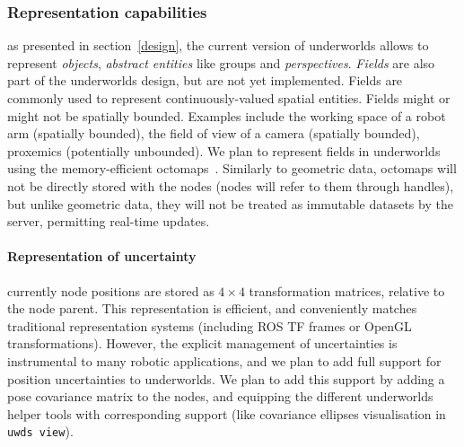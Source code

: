 \documentclass[letterpaper, 10pt, conference]{ieeeconf}
\newcommand{\uwds}{{\sc underworlds}\xspace}
\begin{document}
{\subsubsection{Representation capabilities} as presented in
section~\ref{design}, the current version of \uwds allows to represent
\emph{objects}, \emph{abstract entities} like groups and \emph{perspectives}.
\emph{Fields} are also part of the \uwds design, but are not yet implemented.
Fields are commonly used to represent
continuously-valued spatial entities. Fields might or might not be spatially
bounded. Examples include the working space of a robot arm (spatially bounded),
the field of view of a camera (spatially bounded), proxemics (potentially
unbounded). We plan to represent fields in \uwds using the memory-efficient
octomaps~\cite{hornung2013octomap}. Similarly to geometric data, octomaps
will not be directly stored with the nodes (nodes will refer to them through 
handles), but unlike geometric data, they will not be treated as immutable
datasets by the server, permitting real-time updates.

\paragraph*{Representation of uncertainty} currently node positions are 
stored as $4\times4$ transformation matrices, relative to the node parent. This
representation is efficient, and conveniently matches traditional representation
systems (including ROS TF frames or OpenGL transformations). However, the explicit management
of uncertainties is instrumental to many robotic applications, and we plan to
add full support for position uncertainties to \uwds. We plan to add this
support by adding a pose covariance matrix to the nodes, and equipping the
different \uwds helper tools with corresponding support (like covariance
ellipses visualisation in {\tt uwds view}).



}
\end{document}
